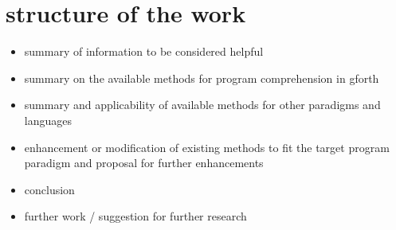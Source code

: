 \section{structure of the work}

\begin{itemize}
\item summary of information to be considered helpful
\item summary on the available methods for program comprehension in gforth
\item summary and applicability of available methods for other paradigms and languages
\item enhancement or modification of existing methods to fit the target program paradigm and proposal for further enhancements
\item conclusion
\item further work / suggestion for further research
\end{itemize}